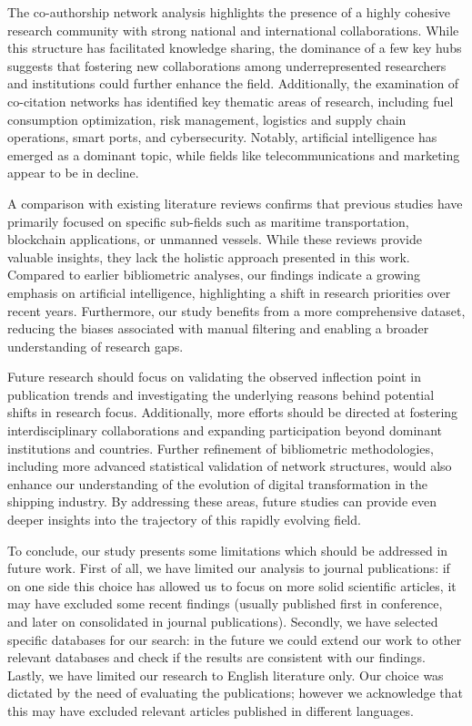 \documentclass[jmse,review,submit,pdftex,moreauthors]{Definitions/mdpi}
\begin{document}
The co-authorship network analysis highlights the presence of a highly cohesive research community with strong national and international collaborations. While this structure has facilitated knowledge sharing, the dominance of a few key hubs suggests that fostering new collaborations among underrepresented researchers and institutions could further enhance the field. Additionally, the examination of co-citation networks has identified key thematic areas of research, including fuel consumption optimization, risk management, logistics and supply chain operations, smart ports, and cybersecurity. Notably, artificial intelligence has emerged as a dominant topic, while fields like telecommunications and marketing appear to be in decline.

A comparison with existing literature reviews confirms that previous studies have primarily focused on specific sub-fields such as maritime transportation, blockchain applications, or unmanned vessels. While these reviews provide valuable insights, they lack the holistic approach presented in this work. Compared to earlier bibliometric analyses, our findings indicate a growing emphasis on artificial intelligence, highlighting a shift in research priorities over recent years. Furthermore, our study benefits from a more comprehensive dataset, reducing the biases associated with manual filtering and enabling a broader understanding of research gaps.

Future research should focus on validating the observed inflection point in publication trends and investigating the underlying reasons behind potential shifts in research focus. Additionally, more efforts should be directed at fostering interdisciplinary collaborations and expanding participation beyond dominant institutions and countries. Further refinement of bibliometric methodologies, including more advanced statistical validation of network structures, would also enhance our understanding of the evolution of digital transformation in the shipping industry. By addressing these areas, future studies can provide even deeper insights into the trajectory of this rapidly evolving field.

To conclude, our study presents some limitations which should be addressed in future work. First of all, we have limited our analysis to journal publications: if on one side this choice has allowed us to focus on more solid scientific articles, it may have excluded some recent findings (usually published first in conference, and later on consolidated in journal publications). Secondly, we have selected specific databases for our search: in the future we could extend our work to other relevant databases and check if the results are consistent with our findings. Lastly, we have limited our research to English literature only. Our choice was dictated by the need of evaluating the publications; however we acknowledge that this may have excluded relevant articles published in different languages.
\end{document}
